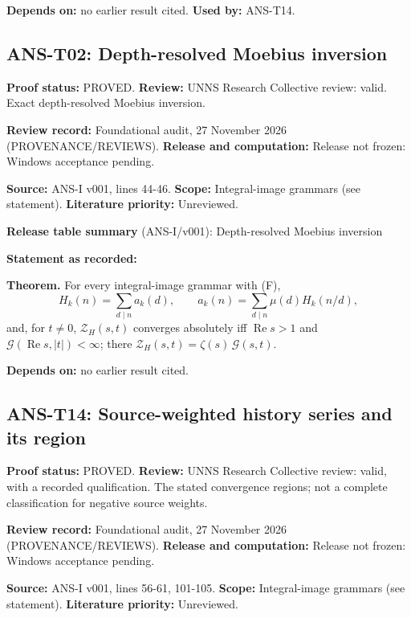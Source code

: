 \documentclass[
  11pt,
]{article}
\begin{document}
\textbf{Depends on:} no earlier result cited. \textbf{Used by:} ANS-T14.

\hypertarget{ans-t02-depth-resolved-moebius-inversion}{%
\subsection{ANS-T02: Depth-resolved Moebius
inversion}\label{ans-t02-depth-resolved-moebius-inversion}}

\textbf{Proof status:} PROVED. \textbf{Review:} UNNS Research Collective
review: valid. Exact depth-resolved Moebius inversion.

\textbf{Review record:} Foundational audit, 27 November 2026
(PROVENANCE/REVIEWS). \textbf{Release and computation:} Release not
frozen: Windows acceptance pending.

\textbf{Source:} ANS-I v001, lines 44-46. \textbf{Scope:} Integral-image
grammars (see statement). \textbf{Literature priority:} Unreviewed.

\textbf{Release table summary} (ANS-I/v001): Depth-resolved Moebius
inversion

\textbf{Statement as recorded:}

\textbf{Theorem.} For every integral-image grammar with (F),
\[H_k(n)=\sum_{d\mid n}a_k(d),\qquad a_k(n)=\sum_{d\mid n}\mu(d)H_k(n/d),\]
and, for \(t\ne0\), \(\mathcal Z_H(s,t)\) converges absolutely iff
\(\operatorname{Re}s>1\) and
\(\mathcal G(\operatorname{Re}s,|t|)<\infty\); there
\(\mathcal Z_H(s,t)=\zeta(s)\,\mathcal G(s,t)\).

\textbf{Depends on:} no earlier result cited.

\hypertarget{ans-t14-source-weighted-history-series-and-its-region}{%
\subsection{ANS-T14: Source-weighted history series and its
region}\label{ans-t14-source-weighted-history-series-and-its-region}}

\textbf{Proof status:} PROVED. \textbf{Review:} UNNS Research Collective
review: valid, with a recorded qualification. The stated convergence
regions; not a complete classification for negative source weights.

\textbf{Review record:} Foundational audit, 27 November 2026
(PROVENANCE/REVIEWS). \textbf{Release and computation:} Release not
frozen: Windows acceptance pending.

\textbf{Source:} ANS-I v001, lines 56-61, 101-105. \textbf{Scope:}
Integral-image grammars (see statement). \textbf{Literature priority:}
Unreviewed.
\end{document}
